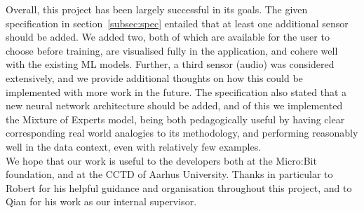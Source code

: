 \documentclass{article}
\begin{document}
Overall, this project has been largely successful in its goals. The given specification in section~\ref{subsec:spec} entailed that at least one additional sensor should be added. We added two, both of which are available for the user to choose before training, are visualised fully in the application, and cohere well with the existing ML models. Further, a third sensor (audio) was considered extensively, and we provide additional thoughts on how this could be implemented with more work in the future. The specification also stated that a new neural network architecture should be added, and of this we implemented the Mixture of Experts model, being both pedagogically useful by having clear corresponding real world analogies to its methodology, and performing reasonably well in the data context, even with relatively few examples. \\

We hope that our work is useful to the developers both at the Micro:Bit foundation, and at the CCTD of Aarhus University. Thanks in particular to Robert for his helpful guidance and organisation throughout this project, and to Qian for his work as our internal supervisor.


\raggedright
\end{document}
